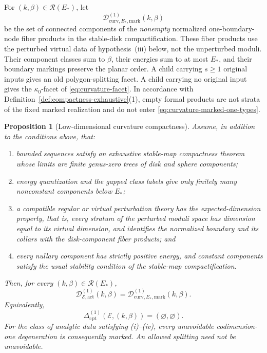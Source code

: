 \documentclass[11pt,letterpaper,twoside]{article}
\theoremstyle{plain}
\newtheorem{proposition}[theorem]{Proposition}
\theoremstyle{definition}
\theoremstyle{remark}
\begin{document}
For $(k,\beta)\in\mathcal R(E_*)$, let
\begin{equation}\label{eq:curvature-marked-one-types}
 \mathcal D^{(1)}_{\mathrm{curv},E_*,\mathrm{mark}}(k,\beta)
\end{equation}
be the set of connected components of the \emph{nonempty} normalized one-boundary-node fiber products in the stable-disk compactification.  These fiber products use the perturbed virtual data of hypothesis~\textup{(iii)} below, not the unperturbed moduli.  Their component classes sum to $\beta$, their energies sum to at most $E_*$, and their boundary markings preserve the planar order.  A child carrying $s\geq1$ original inputs gives an old polygon-splitting facet.  A child carrying no original input gives the $\kappa_0$-facet of \eqref{eq:curvature-facet}.  In accordance with Definition~\ref{def:compactness-exhaustive}(1), empty formal products are not strata of the fixed marked realization and do not enter \eqref{eq:curvature-marked-one-types}.

\begin{proposition}[Low-dimensional curvature compactness]\label{prop:curvature-compactness}
Assume, in addition to the conditions above, that:
\begin{enumerate}[label=\textup{(\roman*)}]
\item bounded sequences satisfy an exhaustive stable-map compactness theorem whose limits are finite genus-zero trees of disk and sphere components;
\item energy quantization and the gapped class labels give only finitely many nonconstant components below $E_*$;
\item a compatible regular or virtual perturbation theory has the expected-dimension property, that is, every stratum of the perturbed moduli space has dimension equal to its virtual dimension, and identifies the normalized boundary and its collars with the disk-component fiber products; and
\item every nullary component has strictly positive energy, and constant components satisfy the usual stability condition of the stable-map compactification.
\end{enumerate}
Then, for every $(k,\beta)\in\mathcal R(E_*)$,
\begin{equation}\label{eq:curvature-compactness-equality}
 \mathcal D^{(1)}_{\mathcal E,\mathrm{act}}(k,\beta)
 =\mathcal D^{(1)}_{\mathrm{curv},E_*,\mathrm{mark}}(k,\beta).
\end{equation}
Equivalently,
\begin{equation}\label{eq:curvature-compactness-defect-zero}
 \Delta^{(1)}_{\mathrm{cpt}}(\mathcal E,(k,\beta))
 =(\varnothing,\varnothing).
\end{equation}
For the class of analytic data satisfying \textup{(i)}--\textup{(iv)}, every unavoidable codimension-one degeneration is consequently marked.  An allowed splitting need not be unavoidable.
\end{proposition}
\end{document}
